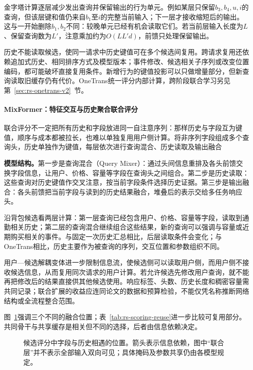 金字塔计算逐层减少发出查询并保留输出的行为单元。例如某层只保留$b_3,b_4,u,i$的查询，但该层键和值仍来自$b_1$至$i$的完整当前输入；下一层才接收缩短后的输出。这与一开始删除$b_1,b_2$不同：较晚单元已经有机会读取它们。若当前层输入长度为$L$、保留查询数为$L'$，注意乘加约为$O(LL'd)$，前馈只处理保留输出。

历史不能读取候选，使同一请求中历史键值可在多个候选间复用。跨请求复用还依赖追加式历史、相同排序方式及模型版本；事件修改、候选相关子序列或改变位置编码，都可能破坏直接复用条件。新增行为的键值投影可以只做增量部分，但新查询读取旧缓存仍有代价。OneTrans统一评分内部计算，跨阶段联合学习另见第~\ref{sec:rs-onetrans-v2}~节。

\Needspace{95mm}
\paragraph{MixFormer：特征交互与历史聚合联合评分}
\label{sec:rs-mixformer}

联合评分不一定把所有历史和字段放进同一自注意序列：那样历史与字段互为键值，顺序与成本都被拉长，也难以单独复用用户侧计算。将非序列字段组成多个查询头，历史单独作为键值，每层依次进行查询混合、历史读取及输出融合

\textbf{模型结构。}第一步是查询混合（Query Mixer）：通过头间信息重排及各头前馈交换字段信息，让用户、价格、容量等字段在查询头之间组合。第二步是历史读取：这些查询对历史键值作交叉注意，按当前字段条件选择历史证据。第三步是输出融合：各头前馈把当前字段与读到的历史结果融合，堆叠后的表示交给多任务响应头。

沿背包候选看两层计算：第一层查询已经包含用户、价格、容量等字段，读取到通勤相关历史；第二层的查询混合继续组合这些结果，新的查询可以强调与容量或近期购买相关的事件。与固定一次历史汇总相比，后层读取条件会变化；与OneTrans相比，历史主要作为被查询的序列，交互位置和参数组织不同。

用户—候选解耦变体进一步限制信息流，使候选侧可以读取用户侧，而用户侧不接收候选信息，从而复用同次请求的用户计算。若允许候选先修改用户查询，就不能再把修改后的结果直接供其他候选使用。响应标签、头数、历史长度和稠密容量需共同记录；联合扩展的收益应连同论文的数据和预算检验，不能仅凭名称推断网络结构或全流程整合范围。

图~\ref{fig:rs-scoring-organization}强调三个不同的融合位置；表~\ref{tab:rs-scoring-reuse}进一步比较可复用部分。共同骨干与共享缓存是相关但不同的选择，后者由信息依赖决定。
\begin{figure}[htbp]
 \centering
 
 \caption{候选评分中字段与历史相遇的位置。箭头表示信息依赖，图中“联合层”并不表示全部输入双向可见；具体掩码及参数共享仍由各模型规定。}
 \label{fig:rs-scoring-organization}
\end{figure}


